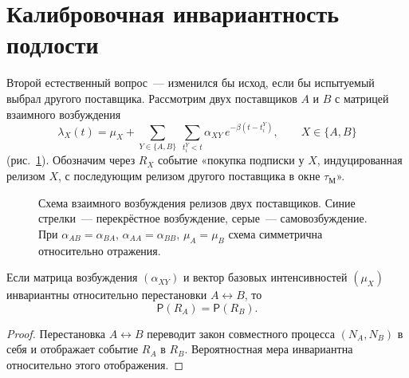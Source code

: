 \documentclass[11pt,a4paper]{article}
\newcommand{\tM}{\tau_{\mathrm{М}}}
\begin{document}
\section{Калибровочная инвариантность подлости}

Второй естественный вопрос~--- изменился бы исход, если бы испытуемый выбрал другого поставщика. Рассмотрим двух поставщиков $A$ и $B$ с матрицей взаимного возбуждения
\[
\lambda_X(t) = \mu_X + \sum_{Y\in\{A,B\}}\ \sum_{t_i^Y<t} \alpha_{XY}\, e^{-\beta(t-t_i^Y)}, \qquad X\in\{A,B\}
\]
(рис.~\ref{fig:gauge}). Обозначим через $R_X$ событие «покупка подписки у $X$, индуцированная релизом $X$, с последующим релизом другого поставщика в окне $\tM$».

\begin{figure}[H]
\centering
{}
\caption{Схема взаимного возбуждения релизов двух поставщиков. Синие стрелки~--- перекрёстное возбуждение, серые~--- самовозбуждение. При $\alpha_{AB}=\alpha_{BA}$, $\alpha_{AA}=\alpha_{BB}$, $\mu_A=\mu_B$ схема симметрична относительно отражения.}
\label{fig:gauge}
\end{figure}

\begin{theorem}
Если матрица возбуждения $(\alpha_{XY})$ и вектор базовых интенсивностей $(\mu_X)$ инвариантны относительно перестановки $A\leftrightarrow B$, то
\[
\mathsf{P}(R_A) = \mathsf{P}(R_B).
\]
\end{theorem}

\begin{proof}
Перестановка $A\leftrightarrow B$ переводит закон совместного процесса $(N_A, N_B)$ в себя и отображает событие $R_A$ в $R_B$. Вероятностная мера инвариантна относительно этого отображения.
\end{proof}
\end{document}
